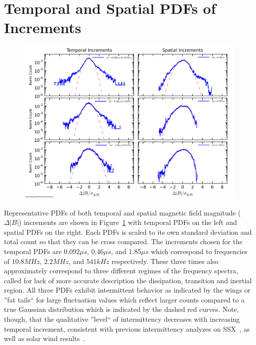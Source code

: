 \documentclass[aps,prl,amsmath,amssymb,reprint,superscriptaddress]{revtex4-1} %
\begin{document}
\section{Temporal and Spatial PDFs of Increments}\label{sec:pdfs}

\begin{figure}[!htbp]
\centerline{
\includegraphics[width=17cm]{Bmod_pdf_temporal_and_spatial_100313Shots41to80_forStructFuncpaper.png}}
\caption{\label{fig:pdfs} }
\end{figure}

Representative PDFs of both temporal and spatial magnetic field magnitude ($\Delta |B|$) increments are shown in Figure~\ref{fig:pdfs} with temporal PDFs on the left and spatial PDFs on the right. Each PDFs is scaled to its own standard deviation and total count so that they can be cross compared. The increments chosen for the temporal PDFs are $0.092\mu s$, $0.46\mu s$, and $1.85\mu s$ which correspond to frequencies of $10.8MHz$, $2.2MHz$, and $541kHz$ respectively. These three times also approximately correspond to three different regimes of the frequency spectra, called for lack of more accurate description the dissipation, transition and inertial region. All three PDFs exhibit intermittent behavior as indicated by the wings or ''fat tails`` for large fluctuation values which reflect larger counts compared to a true Gaussian distribution which is indicated by the dashed red curves. Note, though, that the qualitative ''level`` of intermittency decreases with increasing temporal increment, consistent with previous intermittency analyzes on SSX~\cite{schaffner2014a,schaffner2014b}, as well as solar wind results~\cite{bruno2013}.
\end{document}
